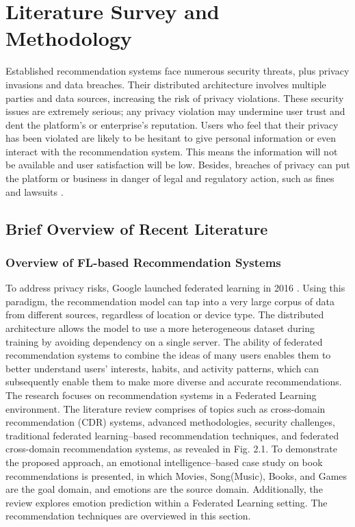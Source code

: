 \chapter{Literature Survey and Methodology}
Established recommendation systems face numerous security threats, plus privacy invasions and data breaches. Their distributed architecture involves multiple parties and data sources, increasing the risk of privacy violations. These security issues are extremely serious; any privacy violation may undermine user trust and dent the platform's or enterprise's reputation. Users who feel that their privacy has been violated are likely to be hesitant to give personal information or even interact with the recommendation system. This means the information will not be available and user satisfaction will be low. Besides, breaches of privacy can put the platform or business in danger of legal and regulatory action, such as fines and lawsuits \cite{ref19}.

\section{Brief Overview of Recent Literature}
\subsection*{Overview of FL-based Recommendation Systems}
To address privacy risks, Google launched federated learning in 2016 \cite{ref20}. Using this paradigm, the recommendation model can tap into a very large corpus of data from different sources, regardless of location or device type. The distributed architecture allows the model to use a more heterogeneous dataset during training by avoiding dependency on a single server. The ability of federated recommendation systems to combine the ideas of many users enables them to better understand users' interests, habits, and activity patterns, which can subsequently enable them to make more diverse and accurate recommendations. The research focuses on recommendation systems in a Federated Learning environment. The literature review comprises of topics such as cross-domain recommendation (CDR) systems, advanced methodologies, security challenges, traditional federated learning--based recommendation techniques, and federated cross-domain recommendation systems, as revealed in Fig. 2.1. To demonstrate the proposed approach, an emotional intelligence--based case study on book recommendations is presented, in which Movies, Song(Music), Books, and Games are the goal domain, and emotions are the source domain. Additionally, the review explores emotion prediction within a Federated Learning setting. The recommendation techniques are overviewed in this section.

